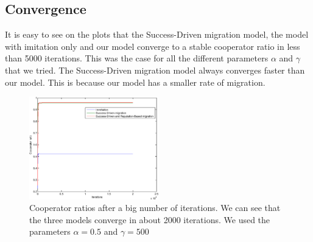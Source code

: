 \documentclass[11pt]{article}
\begin{document}
\subsection{Convergence}
It is easy to see on the plots that the Success-Driven migration model, the model with imitation only and our model converge to a stable cooperator ratio in less than 5000 iterations. This was the case for all the different parameters $\alpha$ and $\gamma$ that we tried.
The Success-Driven migration model always converges faster than our model. This is because our model has a smaller rate of migration.
\begin{figure}[!h]
	\centering
        \includegraphics[width=0.5\textwidth]{../../other/plots/convergence-20000.eps}
	\caption{Cooperator ratios after a big number of iterations. We can see that the three models converge in about 2000 iterations. We used the parameters $\alpha = 0.5$ and $\gamma = 500$}
\end{figure}
\end{document}
